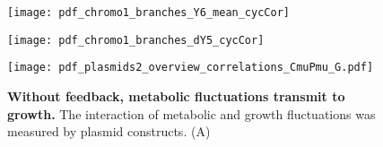 \clearpage



\begin{figure}
	\centering
	\texttt{[image: pdf\_chromo1\_branches\_Y6\_mean\_cycCor]}
	\clearpage %
	\label{fig:XXX:XXX}
\end{figure}	

\clearpage



\begin{figure}
	\centering
	\texttt{[image: pdf\_chromo1\_branches\_dY5\_cycCor]}
	\clearpage %
	\label{fig:XXX:XXX}
\end{figure}	

\clearpage






\begin{figure}
	\centering
	\texttt{[image: pdf\_plasmids2\_overview\_correlations\_CmuPmu\_G.pdf]}
	\caption{ 
		\textbf{Without feedback, metabolic fluctuations transmit to growth.}
		The interaction of metabolic and growth fluctuations was measured by plasmid constructs.
		(A) 
	}
	\label{fig:CRP:plasmidCCs}
\end{figure}
